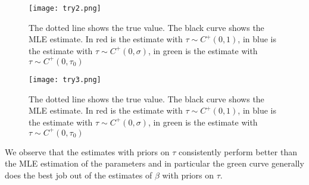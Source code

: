 \documentclass{article}
\begin{document}
 \begin{figure}[H]
\centering
\texttt{[image: try2.png]}
\caption{The dotted line shows the true value. The black curve shows the MLE estimate. In red is the estimate with $\tau \sim C^{+}(0, 1)$, in blue is the estimate with $\tau \sim C^{+}(0, \sigma)$, in green is the estimate with $\tau \sim C^{+}(0, \tau_0)$ }
\label{deltat}
\end{figure}

 \begin{figure}[H]
\centering
\texttt{[image: try3.png]}
\caption{The dotted line shows the true value. The black curve shows the MLE estimate. In red is the estimate with $\tau \sim C^{+}(0, 1)$, in blue is the estimate with $\tau \sim C^{+}(0, \sigma)$, in green is the estimate with $\tau \sim C^{+}(0, \tau_0)$ }
\label{deltat}
\end{figure}
We observe that the estimates with priors on $\tau$ consistently perform better than the MLE estimation of the parameters and in particular the green curve generally does the best job out of the estimates of $\beta$ with priors on $\tau$.
 
\end{document}
